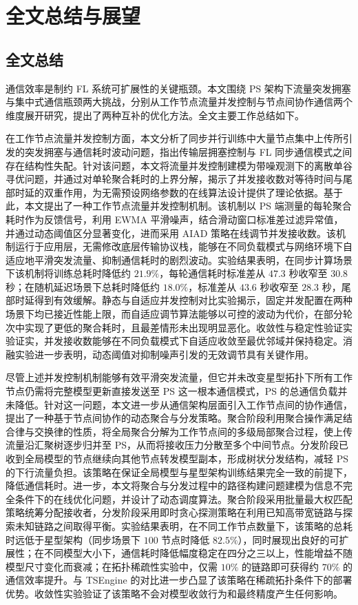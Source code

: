 \documentclass[master, vlined]{DissertUESTC}
\begin{document}
	\chapter{全文总结与展望}

	\section{全文总结}

	通信效率是制约 FL 系统可扩展性的关键瓶颈。本文围绕 PS 架构下流量突发拥塞与集中式通信瓶颈两大挑战，分别从工作节点流量并发控制与节点间协作通信两个维度展开研究，提出了两种互补的优化方法。全文主要工作总结如下。

	在工作节点流量并发控制方面，本文分析了同步并行训练中大量节点集中上传所引发的突发拥塞与通信耗时波动问题，指出传输层拥塞控制与 FL 同步通信模式之间存在结构性失配。针对该问题，本文将流量并发控制建模为带噪观测下的离散单谷寻优问题，并通过对单轮聚合耗时的上界分解，揭示了并发接收数对等待时间与尾部时延的双重作用，为无需预设网络参数的在线算法设计提供了理论依据。基于此，本文提出了一种工作节点流量并发控制机制。该机制以 PS 端测量的每轮聚合耗时作为反馈信号，利用 EWMA 平滑噪声，结合滑动窗口标准差过滤异常值，并通过动态阈值区分显著变化，进而采用 AIAD 策略在线调节并发接收数。该机制运行于应用层，无需修改底层传输协议栈，能够在不同负载模式与网络环境下自适应地平滑突发流量、抑制通信耗时的剧烈波动。实验结果表明，在同步计算场景下该机制将训练总耗时降低约 $21.9\%$，每轮通信耗时标准差从 $47.3$ 秒收窄至 $30.8$ 秒；在随机延迟场景下总耗时降低约 $18.0\%$，标准差从 $43.6$ 秒收窄至 $28.3$ 秒，尾部时延得到有效缓解。静态与自适应并发控制对比实验揭示，固定并发配置在两种场景下均已接近性能上限，而自适应调节算法能够以可控的波动为代价，在部分轮次中实现了更低的聚合耗时，且最差情形未出现明显恶化。收敛性与稳定性验证实验证实，并发接收数能够在不同负载模式下自适应收敛至最优邻域并保持稳定。消融实验进一步表明，动态阈值对抑制噪声引发的无效调节具有关键作用。

	尽管上述并发控制机制能够有效平滑突发流量，但它并未改变星型拓扑下所有工作节点仍需将完整模型更新直接发送至 PS 这一根本通信模式，PS 的总通信负载并未降低。针对这一问题，本文进一步从通信架构层面引入工作节点间的协作通信，提出了一种基于节点间协作的动态聚合与分发策略。聚合阶段利用聚合操作满足结合律与交换律的性质，将全局聚合分解为工作节点间的多级局部聚合过程，使上传流量沿汇聚树逐步归并至 PS，从而将接收压力分散至多个中间节点。分发阶段已收到全局模型的节点继续向其他节点转发模型副本，形成树状分发结构，减轻 PS 的下行流量负担。该策略在保证全局模型与星型架构训练结果完全一致的前提下，降低通信耗时。进一步，本文将聚合与分发过程中的路径构建问题建模为信息不完全条件下的在线优化问题，并设计了动态调度算法。聚合阶段采用批量最大权匹配策略统筹分配接收者，分发阶段采用即时贪心探测策略在利用已知高带宽链路与探索未知链路之间取得平衡。实验结果表明，在不同工作节点数量下，该策略的总耗时远低于星型架构（同步场景下 $100$ 节点时降低 $82.5\%$），同时展现出良好的可扩展性；在不同模型大小下，通信耗时降低幅度稳定在四分之三以上，性能增益不随模型尺寸变化而衰减；在拓扑稀疏性实验中，仅需 $10\%$ 的链路即可获得约 $70\%$ 的通信效率提升。与 TSEngine 的对比进一步凸显了该策略在稀疏拓扑条件下的部署优势。收敛性实验验证了该策略不会对模型收敛行为和最终精度产生任何影响。
\end{document}
